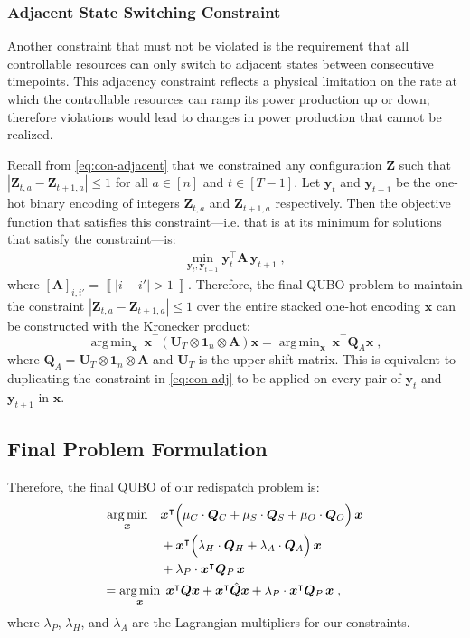 \documentclass[conference]{IEEEtran}
\makeatletter
\newcommand{\bZ}{\boldsymbol{Z}}
\newcommand{\by}{\boldsymbol{y}}
\newcommand{\bQ}{\boldsymbol{Q}}
\newcommand{\ones}[1]{\boldsymbol{1}_{#1}}
\newcommand{\ups}[1]{\boldsymbol{U}_{#1}}
\newcommand{\trans}{\intercal}
\newcommand{\indices}[1]{[#1]}
\newcommand{\iverson}[1]{\left\llbracket #1\, \right\rrbracket}
\newcommand{\bx}{\boldsymbol{x}}
\newcommand{\g}[1]{#1}
\newcommand{\adjswitch}{\boldsymbol{A}}
\newcommand{\mat}[1]{\bm{#1}}
\DeclareMathOperator*{\argmin}{arg\,min}
\newcommand{\QUBO}{\textsc{QUBO}\@\xspace}
\makeatother
\begin{document}
\subsubsection{Adjacent State Switching Constraint}
\label{sec:constr-adj}
Another constraint that must not be violated is the requirement that all
controllable resources can only switch to adjacent states between
consecutive timepoints. This adjacency constraint reflects a physical
limitation on the rate at which the controllable resources can ramp its
power production up or down; therefore violations would lead to
changes in power production that cannot be realized.

Recall from \cref{eq:con-adjacent} that we constrained any configuration
$\bZ$ such that $|\g{\bZ}_{t,a} - \g{\bZ}_{t+1,a}| \leq 1$ for all
$a\in\indices{n}$ and $t \in\indices{T-1}$.  Let $\by_{t}$ and
$\by_{t+1}$ be the one-hot binary encoding of integers $\g{\bZ}_{t,a}$
and $\g{\bZ}_{t+1,a}$ respectively. Then the objective function that
satisfies this constraint---i.e. that is at its minimum for solutions that
satisfy the constraint---is:
\begin{gather}
  \label{eq:con-adj}
  \min_{\by_{t},\by_{t+1}} \by_{t}^{\trans} \adjswitch \, \by_{t+1}\;,
\end{gather}
where $[\adjswitch]_{i,i'} = \iverson{|i - i'| > 1}$.  Therefore, the
final {\QUBO} problem to maintain the constraint
$|\g{\bZ}_{t,a} - \g{\bZ}_{t+1,a}| \leq 1$ over the entire stacked
one-hot encoding $\bx$ can be constructed with the Kronecker product:
\begin{equation}
  \label{eq:9}
  \argmin_{\bx} \: \bx^{\trans}(\ups{T} \otimes \ones{n} \otimes \adjswitch)\bx
  =\argmin_{\bx} \: \bx^{\trans}\bQ_{A}\bx \;,
\end{equation}
where $\bQ_{A}=\ups{T} \otimes \ones{n} \otimes \adjswitch$ and $\ups{T}$
is the upper shift matrix. This is equivalent to duplicating the
constraint in \cref{eq:con-adj} to be applied on every pair of $\by_{t}$
and $\by_{t+1}$ in $\bx$.

\subsection{Final Problem Formulation}
Therefore, the final {\QUBO} of our redispatch problem is:
\begin{equation}
  \label{eq:fin-obj}
  \begin{aligned}
    \argmin_{\bx}\quad
    &\bx^{\trans} \Bigl(
      \mu_{C}\cdot\bQ_{C} + \mu_{S}\cdot\bQ_{S} + \mu_{O}\cdot\bQ_{O}
      \Bigr)\, \bx\\
    &+\bx^{\trans} \Bigl(
       \lambda_{H} \cdot\mat{Q}_{H} +
      \lambda_{A}\cdot\mat{Q}_{A}\Bigr)\, \bx\\
    & + \lambda_{P} \cdot \bx^{\trans}\mat{Q}_{P}\,\bx\\
    =\argmin_{\bx}& \:\:\bx^{\trans}\bQ \bx + \bx^{\trans}\hat{\bQ} \bx
                    + \lambda_{P} \cdot \bx^{\trans}\mat{Q}_{P}\,\bx\;,
  \end{aligned}
\end{equation}
where $\lambda_{P}$, $\lambda_{H}$, and $\lambda_{A}$ are the Lagrangian
multipliers for our constraints.
\end{document}
